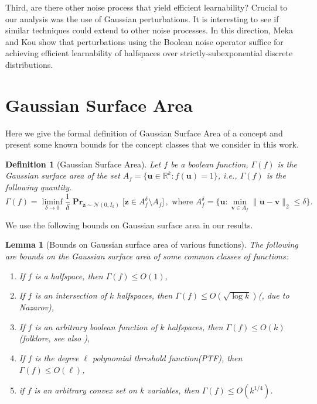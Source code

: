 \documentclass[10pt,a4paper]{article}
\newtheorem{lemma}{Lemma}[section]
\newtheorem{definition}{Definition}[section]
\newcommand\twonorm[1]{\|#1\|_2}
\renewcommand\vec[1]{\mathbf{#1}}
\DeclareMathOperator*{\pr}{\mathbf{Pr}}
\newcommand{\R}{\mathbb{R}}
\newcommand{\1}{\Ind}
\newcommand{\vv}{\vec v}
\newcommand{\vu}{\vec u}
\newcommand{\z}{\vec z}
\newcommand{\Gauss}{\mathcal{N}}
\begin{document}
Third, are there other noise process that yield efficient learnability? Crucial to our analysis was the use of Gaussian perturbations. It is interesting to see if similar techniques could extend to other noise processes. In this direction, Meka and Kou \cite{kou2025smoothed} show that perturbations using the Boolean noise operator suffice for achieving efficient learnability of halfspaces over strictly-subexponential discrete distributions. 


%
%




\newpage
\appendix

\section{Gaussian Surface Area}

Here we give the formal definition of Gaussian Surface Area of a concept and present some known
bounds for the concept classes that we consider in this work.

\begin{definition}[Gaussian Surface Area]
\label{def:GSA}
Let $f$ be a boolean function, $\Gamma(f)$ is the Gaussian surface area of the set $A_f = \{\vu\in \R^k: f(\vu) = 1\}$, i.e., $\Gamma(f)$ is the following quantity.
\[
    \Gamma(f) = \liminf_{\delta \to 0} \frac{1}{\delta} \pr_{\z\sim\Gauss(0,I_k)}\bigr[\z \in A_f^\delta \setminus A_f\bigr]\,, \text{ where }A_f^\delta = \{\vu: \min_{\vv\in A_f}\twonorm{\vu-\vv} \le \delta\}.
\]
\end{definition}

We use the following bounds on Gaussian surface area in our results.
\begin{lemma}[Bounds on Gaussian surface area of various functions]
\label{lem:gsa_bounds}
The following are bounds on the Gaussian surface area of some common classes of functions:
\begin{enumerate}
    \item If $f$ is a halfspace, then $\Gamma(f)\leq O(1)$\cite{KOS:08},
    \item If $f$ is an intersection of $k$ halfspaces, then $\Gamma(f)\leq O(\sqrt{\log k})$(\cite{KOS:08}, due to Nazarov),
    \item If $f$ is an arbitrary boolean function of $k$ halfspaces, then $\Gamma(f)\leq O(k)$
    (folklore, see also ),
    \item If $f$ is the degree $\ell$ polynomial threshold function(PTF), then $\Gamma(f)\leq O(\ell)$\cite{Kane11},
    \item if $f$ is an arbitrary convex set on $k$ variables, then $\Gamma(f)\leq O(k^{1/4})$\cite{Ball:93}.
\end{enumerate}
\end{lemma}
\end{document}
